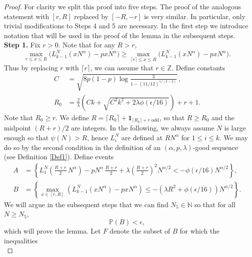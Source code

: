 	\begin{proof}
		
		For clarity we split this proof into five steps. The proof of the analogous statement with $[r,R]$ replaced by $[-R,-r]$ is very similar. In particular, only trivial modifications to Steps 4 and 5 are necessary. In the first step we introduce notation that will be used in the proof of the lemma in the subsequent steps.\\
		
		\noindent\textbf{Step 1.} Fix $r>0$. Note that for any $R>r$,
		\[
		\max_{r\leq x\leq R} \big(L_{k-1}^N(xN^\alpha) - pxN^\alpha\big) \geq \max_{\lceil r\rceil \leq x \leq R} \big(L_{k-1}^N(xN^\alpha) - pxN^\alpha\big).
		\]
		Thus by replacing $r$ with $\lceil r\rceil$, we can assume that $r\in\mathbb{Z}$. Define constants
		\begin{align}
		C &= \sqrt{ 8p(1-p) \log\frac{3}{1-(11/12)^{1/(k-2)}}}\,,\label{21Cdef}\\
		R_0 &= \frac{2}{\lambda}\left(Ck+\sqrt{C^{2}k^{2}+2\lambda\phi(\epsilon/16)}\right) + r + 1. \label{21Rdef}
		\end{align}
		Note that $R_0\geq r$. We define $R = \lceil R_0\rceil + \mathbf{1}_{\lceil R_0\rceil + r\;\mathrm{odd}}$, so that $R\geq R_0$ and the midpoint $(R+r)/2$ are integers. In the following, we always assume $N$ is large enough so that $\psi(N) > R$, hence $L_i^N$ are defined at $RN^\alpha$ for $1\leq i\leq k$. We may do so by the second condition in the definition of an $(\alpha,p,\lambda)$-good sequence (see Definition \ref{Def1}). Define events
		\begin{equation}\label{21AB}
		\begin{split}
		A &= \left\{L_1^N\left(\frac{R+r}{2}\,N^\alpha\right) - pN^\alpha\,\frac{R+r}{2} + \lambda\left(\frac{R+r}{2}\right)^2 N^{\alpha/2} < -\phi(\epsilon/16)N^{\alpha/2}\right\},\\
		B &= \left\{\max_{x\in[r,R]} \left(L_{k-1}^N(xN^\alpha) - pxN^\alpha\right) \leq -(\lambda R^2 + \phi(\epsilon/16)) N^{\alpha/2} \right\}.
		\end{split}
		\end{equation}
		We will argue in the subsequent steps that we can find $N_5\in\mathbb{N}$ so that for all $N\geq N_5$,
		\begin{equation}\label{21Bbound}
		\mathbb{P}(B) < \epsilon,
		\end{equation}
		which will prove the lemma. Let $F$ denote the subset of $B$ for which the inequalities
		\begin{equation}\label{21x1y1}

\end{equation}
\end{proof}
